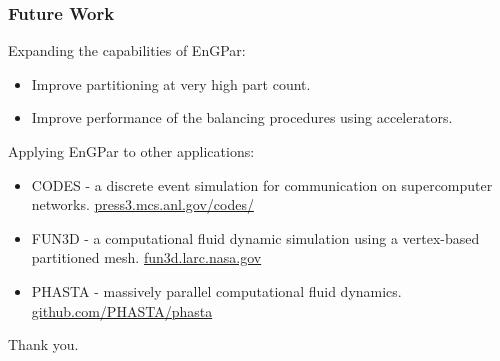\documentclass{beamer}
\begin{document}
\begin{frame}
  \frametitle{Future Work}
  Expanding the capabilities of EnGPar:
  \begin{itemize}
  \item Improve partitioning at very high part count.
  \item Improve performance of the balancing procedures using accelerators.
  \end{itemize}
  Applying EnGPar to other applications:
  \begin{itemize}
  \item CODES - a discrete event simulation for communication on supercomputer networks. \url{press3.mcs.anl.gov/codes/}
  \item FUN3D - a computational fluid dynamic simulation using a vertex-based partitioned mesh. \url{fun3d.larc.nasa.gov}
  \item PHASTA - massively parallel computational fluid dynamics. \url{github.com/PHASTA/phasta}

  \end{itemize}
\end{frame}

\begin{frame}
  \centering
  \Huge{Thank you.}
\end{frame}
\end{document}
